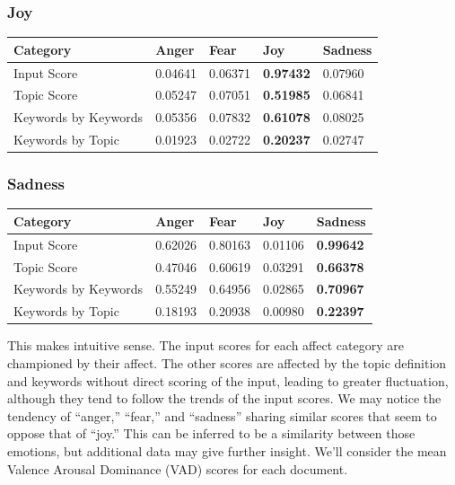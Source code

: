 \documentclass[11pt, twoside, reqno]{book}
\begin{document}
\subsubsection{\textbf{Joy}}

\begin{table}[h!]
    \raggedright
    \begin{tabular}{|l|l|l|l|l|}
    \hline
    Category & Anger & Fear & Joy & Sadness \\\hline
    Input Score & 0.04641 & 0.06371 & \textbf{0.97432} & 0.07960 \\\hline
    Topic Score & 0.05247 & 0.07051 & \textbf{0.51985} & 0.06841 \\\hline
    Keywords by Keywords & 0.05356 & 0.07832 & \textbf{0.61078} & 0.08025 \\\hline
    Keywords by Topic & 0.01923 & 0.02722 & \textbf{0.20237} & 0.02747 \\\hline
    \end{tabular}
\end{table}

\subsubsection{\textbf{Sadness}}

\begin{table}[h!]
    \raggedright
    \begin{tabular}{|l|l|l|l|l|}
    \hline
    Category & Anger & Fear & Joy & Sadness \\\hline
    Input Score & 0.62026 & 0.80163 & 0.01106 & \textbf{0.99642} \\\hline
    Topic Score & 0.47046 & 0.60619 & 0.03291 & \textbf{0.66378} \\\hline
    Keywords by Keywords & 0.55249 & 0.64956 & 0.02865 & \textbf{0.70967} \\\hline
    Keywords by Topic & 0.18193 & 0.20938 & 0.00980 & \textbf{0.22397} \\\hline
    \end{tabular}
\end{table}

This makes intuitive sense. The input scores for each affect category are championed by their affect. The other scores are affected by the topic definition and keywords without direct scoring of the input, leading to greater fluctuation, although they tend to follow the trends of the input scores. We may notice the tendency of ``anger,'' ``fear,'' and ``sadness'' sharing similar scores that seem to oppose that of ``joy.'' This can be inferred to be a similarity between those emotions, but additional data may give further insight. We'll consider the mean Valence Arousal Dominance (VAD) scores for each document.
\end{document}
